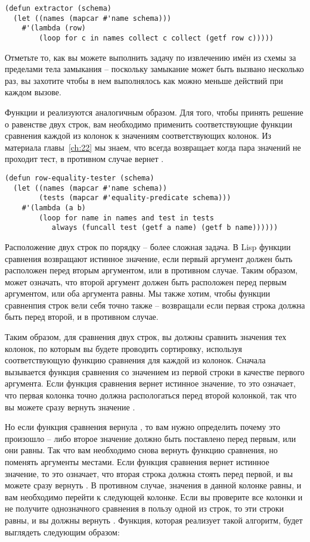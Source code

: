 \begin{lstlisting}
(defun extractor (schema)
  (let ((names (mapcar #'name schema)))
    #'(lambda (row)
        (loop for c in names collect c collect (getf row c)))))
\end{lstlisting}

Отметьте то, как вы можете выполнить задачу по извлечению имён из схемы за пределами тела
замыкания -- поскольку замыкание может быть вызвано несколько раз, вы захотите чтобы в нем
выполнялось как можно меньше действий при каждом вызове.

Функции  и  реализуются аналогичным
образом.  Для того, чтобы принять решение о равенстве двух строк, вам необходимо применить
соответствующие функции сравнения каждой из колонок к значениям соответствующих колонок.
Из материала главы~\ref{ch:22} мы знаем, что  всегда возвращает 
когда пара значений не проходит тест, в противном случае  вернет .

\begin{lstlisting}
(defun row-equality-tester (schema)
  (let ((names (mapcar #'name schema))
        (tests (mapcar #'equality-predicate schema)))
    #'(lambda (a b)
        (loop for name in names and test in tests
           always (funcall test (getf a name) (getf b name))))))
\end{lstlisting}

Расположение двух строк по порядку -- более сложная задача.  В Lisp функции сравнения
возвращают истинное значение, если первый аргумент должен быть расположен перед вторым
аргументом, или  в противном случае.  Таким образом,  может означать,
что второй аргумент должен быть расположен перед первым аргументом, или оба аргумента
равны. Мы также хотим, чтобы функции сравненпия строк вели себя точно также -- возвращали
 если первая строка должна быть перед второй, и  в противном случае.

Таким образом, для сравнения двух строк, вы должны сравнить значения тех колонок, по
которым вы будете проводить сортировку, используя соответствующую функцию сравнения для
каждой из колонок.  Сначала вызывается функция сравнения со значением из первой строки в
качестве первого аргумента.  Если функция сравнения вернет истинное значение, то это
означает, что первая колонка точно должна распологаться перед второй колонкой, так что вы
можете сразу вернуть значение .

Но если функция сравнения вернула , то вам нужно определить почему это произошло
-- либо второе значение должно быть поставлено перед первым, или они равны.  Так что вам
необходимо снова вернуть функцию сравнения, но поменять аргументы местами.  Если функция
сравнения вернет истинное значение, то это означает, что вторая строка должна стоять перед
первой, и вы можете сразу вернуть .  В противном случае, значения в данной
колонке равны, и вам необходимо перейти к следующей колонке.  Если вы проверите все
колонки и не получите однозначного сравнения в пользу одной из строк, то эти строки равны,
и вы должны вернуть .  Функция, которая реализует такой алгоритм, будет
выглядеть следующим образом:

